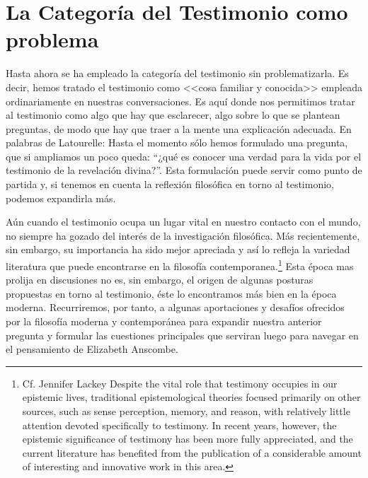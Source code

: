 \section{La Categoría del Testimonio como problema}

Hasta ahora se ha empleado la categoría del testimonio sin problematizarla. Es
decir, hemos tratado el testimonio como <<cosa familiar y conocida>> empleada
ordinariamente en nuestras conversaciones. Es aquí donde nos permitimos tratar
al testimonio como algo que hay que esclarecer, algo sobre lo que se plantean
preguntas, de modo que hay que traer a la mente una explicación adecuada. En
palabras de Latourelle:
Hasta el momento sólo hemos formulado una pregunta, que si ampliamos un poco
queda: ``¿qué es conocer una verdad para la vida por el testimonio de la
revelación divina?''. Esta formulación puede servir como punto de partida y, si
tenemos en cuenta la reflexión filosófica en torno al testimonio, podemos
expandirla más.

Aún cuando el testimonio ocupa un lugar vital en nuestro contacto con el mundo,
no siempre ha gozado del interés de la investigación filosófica. Más
recientemente, sin embargo, su importancia ha sido mejor apreciada y así lo
refleja la variedad literatura que puede encontrarse en la filosofía
contemporanea.\footnote{Cf. Jennifer Lackey Despite the vital role that
  testimony occupies in our epistemic lives, traditional epistemological
  theories focused primarily on other sources, such as sense perception, memory,
  and reason, with relatively little attention devoted specifically to
  testimony. In recent years, however, the epistemic significance of testimony
  has been more fully appreciated, and the current literature has benefited from
  the publication of a considerable amount of interesting and innovative work in
  this area.}
Esta época mas prolija en discusiones no es, sin embargo, el origen de algunas
posturas propuestas en torno al testimonio, éste lo encontramos más bien en la
época moderna. Recurriremos, por tanto, a algunas aportaciones y desafíos
ofrecidos por la filosofía moderna y contemporánea para expandir nuestra
anterior pregunta y formular las cuestiones principales que serviran luego para
navegar en el pensamiento de Elizabeth Anscombe.


